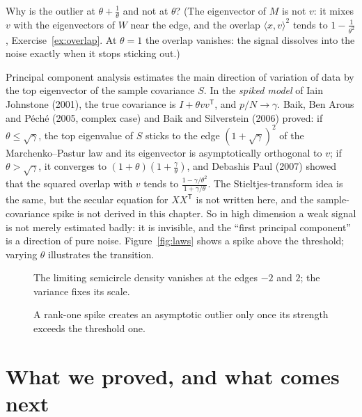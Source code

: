 \begin{think}
Why is the outlier at $\theta+\frac1\theta$ and not at $\theta$? (The eigenvector of $M$ is not $v$: it mixes $v$ with the eigenvectors of $W$ near the edge, and the overlap $\langle x,v\rangle^2$ tends to $1-\frac1{\theta^2}$, Exercise~\ref{ex:overlap}. At
$\theta=1$ the overlap vanishes: the signal dissolves into the noise exactly when it stops sticking out.)
\end{think}

\begin{remark}
Principal component analysis estimates the main direction of variation of data by the top eigenvector of the sample covariance $S$. In the \emph{spiked model} of Iain Johnstone (2001), the true covariance is $I+\theta vv^{\mathsf T}$, and
$p/N\to\gamma$. Baik, Ben Arous and P\'ech\'e (2005, complex case) and Baik and Silverstein (2006) proved: if $\theta\le\sqrt\gamma$, the top eigenvalue of $S$ sticks to the edge $(1+\sqrt\gamma)^2$ of the Marchenko--Pastur law and its
eigenvector is asymptotically orthogonal to $v$; if $\theta>\sqrt\gamma$, it converges to $(1+\theta)(1+\frac\gamma\theta)$, and Debashis Paul (2007) showed that the squared overlap with $v$ tends to
$\frac{1-\gamma/\theta^2}{1+\gamma/\theta}$. The Stieltjes-transform idea is the same, but the secular equation for $XX^{\mathsf T}$ is not written here, and the sample-covariance spike is not derived in this chapter. So in high dimension a weak signal is not merely estimated badly: it is invisible, and the
``first principal component'' is a direction of pure noise. Figure~\ref{fig:laws} shows a spike above the threshold; varying $\theta$ illustrates the transition.
\end{remark}

\begin{figure}[ht]
\centering
{}
\caption{The limiting semicircle density vanishes at the edges $-2$ and $2$; the variance fixes its scale.}
\label{fig:v12semicircle}
\end{figure}

\begin{figure}[ht]
\centering
{}
\caption{A rank-one spike creates an asymptotic outlier only once its strength exceeds the threshold one.}
\label{fig:v12outliercurve}
\end{figure}

\section{What we proved, and what comes next}

